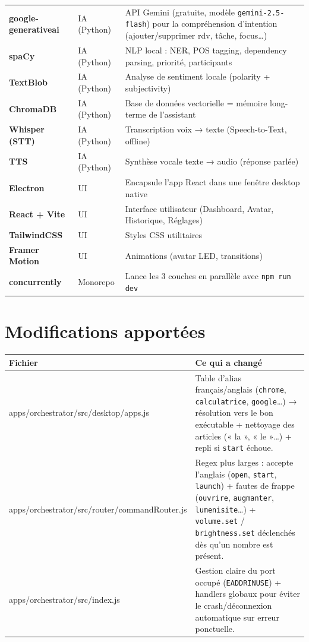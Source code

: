 \documentclass[12pt,a4paper]{article}
\begin{document}
\begin{longtable}{>{\bfseries}p{4.5cm} p{2.5cm} p{7.5cm}}
\addlinespace
google-generativeai & IA (Python) & API Gemini (gratuite, modèle \texttt{gemini-2.5-flash}) pour la compréhension d'intention (ajouter/supprimer rdv, tâche, focus…) \\
\addlinespace
spaCy & IA (Python) & NLP local : NER, POS tagging, dependency parsing, priorité, participants \\
\addlinespace
TextBlob & IA (Python) & Analyse de sentiment locale (polarity + subjectivity) \\
\addlinespace
ChromaDB & IA (Python) & Base de données vectorielle = mémoire long-terme de l'assistant \\
\addlinespace
Whisper (STT) & IA (Python) & Transcription voix → texte (Speech-to-Text, offline) \\
\addlinespace
TTS & IA (Python) & Synthèse vocale texte → audio (réponse parlée) \\
\addlinespace
Electron & UI & Encapsule l'app React dans une fenêtre desktop native \\
\addlinespace
React + Vite & UI & Interface utilisateur (Dashboard, Avatar, Historique, Réglages) \\
\addlinespace
TailwindCSS & UI & Styles CSS utilitaires \\
\addlinespace
Framer Motion & UI & Animations (avatar LED, transitions) \\
\addlinespace
concurrently & Monorepo & Lance les 3 couches en parallèle avec \texttt{npm run dev} \\

\bottomrule
\end{longtable}

\section{Modifications apportées}

\begin{longtable}{>{\ttfamily}p{7cm} p{8cm}}
\toprule
\normalfont\bfseries Fichier & \bfseries Ce qui a changé \\
\midrule
\endhead

apps/orchestrator/src/desktop/apps.js
  & Table d'alias français/anglais (\texttt{chrome}, \texttt{calculatrice}, \texttt{google}…) → résolution vers le bon exécutable + nettoyage des articles (« la », « le »…) + repli si \texttt{start} échoue. \\
\addlinespace
apps/orchestrator/src/router/commandRouter.js
  & Regex plus larges : accepte l'anglais (\texttt{open}, \texttt{start}, \texttt{launch}) + fautes de frappe (\texttt{ouvrire}, \texttt{augmanter}, \texttt{lumenisite}…) + \texttt{volume.set} / \texttt{brightness.set} déclenchés dès qu'un nombre est présent. \\
\addlinespace
apps/orchestrator/src/index.js
  & Gestion claire du port occupé (\texttt{EADDRINUSE}) + handlers globaux pour éviter le crash/déconnexion automatique sur erreur ponctuelle. \\

\bottomrule
\end{longtable}
\end{document}
